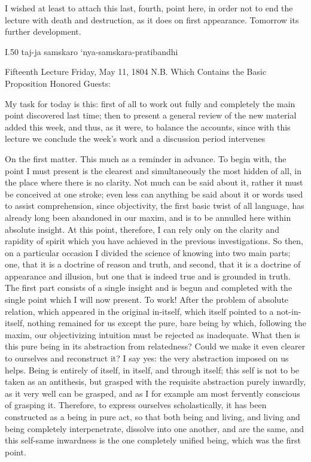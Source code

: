 I wished at least to attach this last, fourth, point here,
in order not to end the lecture with death and destruction,
as it does on first appearance.
Tomorrow its further development.

I.50
taj-ja samskaro ‘nya-samskara-pratibandhi

Fifteenth Lecture
Friday, May 11, 1804
N.B. Which Contains the Basic Proposition
Honored Guests:

My task for today is this:
first of all to work out fully and completely
the main point discovered last time;
then to present a general review of
the new material added this week,
and thus, as it were, to balance the accounts,
since with this lecture we conclude the week’s work
and a discussion period intervenes

On the first matter.
This much as a reminder in advance.
To begin with, the point I must present is
the clearest and simultaneously the most hidden of all,
in the place where there is no clarity.
Not much can be said about it,
rather it must be conceived at one stroke;
even less can anything be said about it
or words used to assist comprehension,
since objectivity, the first basic twist of all language,
has already long been abandoned in our maxim,
and is to be annulled here within absolute insight.
At this point, therefore, I can rely only
on the clarity and rapidity of spirit
which you have achieved in the previous investigations.
So then, on a particular occasion I divided
the science of knowing into two main parts;
one, that it is a doctrine of reason and truth,
and second, that it is a doctrine of appearance and illusion,
but one that is indeed true and is grounded in truth.
The first part consists of a single insight and is begun
and completed with the single point which I will now present.
To work!
After the problem of absolute relation,
which appeared in the original in-itself,
which itself pointed to a not-in-itself,
nothing remained for us except
the pure, bare being by which, following the maxim,
our objectivizing intuition must be rejected as inadequate.
What then is this pure being in its abstraction from relatedness?
Could we make it even clearer to ourselves and reconstruct it?
I say yes: the very abstraction imposed on us helps.
Being is entirely of itself, in itself, and through itself;
this self is not to be taken as an antithesis,
but grasped with the requisite abstraction purely inwardly,
as it very well can be grasped,
and as I for example am most fervently conscious of grasping it.
Therefore, to express ourselves scholastically,
it has been constructed as a being in pure act,
so that both being and living, and living and being
completely interpenetrate, dissolve into one another,
and are the same, and this self-same inwardness is
the one completely unified being,
which was the first point.


